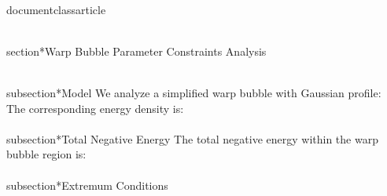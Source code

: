 \\documentclass{article}
\begin{document}
\\section*{Warp Bubble Parameter Constraints Analysis}

\\subsection*{Model}
We analyze a simplified warp bubble with Gaussian profile:
\\[
  f(r,t) = 1 + A e^{-\\frac{(r-R)^2}{\\sigma^2}} e^{-\\frac{t^2}{\\sigma^2}}
\\]

The corresponding energy density is:
\\[
  T^{00}(r,t) = -\\frac{A^2}{8\\pi r^2} e^{-\\frac{2(r-R)^2}{\\sigma^2}} e^{-\\frac{2t^2}{\\sigma^2}}
\\]

\\subsection*{Total Negative Energy}
The total negative energy within the warp bubble region is:
\\[
  E_{\\rm neg}(R,\\sigma,A) = 2 \pi \left(- \frac{\sqrt{2} A^{2} \sigma \operatorname{erf}{\left(\frac{\sqrt{2} R}{\sigma} \right)}}{16 \sqrt{\pi}} - \frac{\sqrt{2} A^{2} \sigma \operatorname{erf}{\left(\frac{2 \sqrt{2} R}{\sigma} \right)}}{16 \sqrt{\pi}}\right)
\\]

\\subsection*{Extremum Conditions}
\\[
  \\frac{\\partial E_{\\rm neg}}{\\partial R} = 2 \pi \left(- \frac{A^{2} e^{- \frac{2 R^{2}}{\sigma^{2}}}}{4 \pi} - \frac{A^{2} e^{- \frac{8 R^{2}}{\sigma^{2}}}}{2 \pi}\right) = 0
\\]
\\[
  \\Longrightarrow R = \text{No analytical solutions found}
\\]
\end{document}
